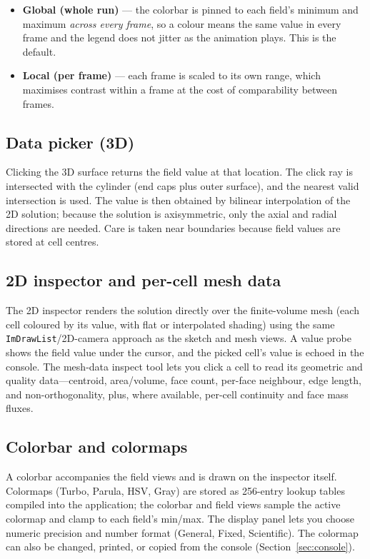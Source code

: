 \documentclass[11pt]{article}
\begin{document}
\begin{itemize}[nosep]
  \item \textbf{Global (whole run)} --- the colorbar is pinned to each field's minimum
        and maximum \emph{across every frame}, so a colour means the same value in every
        frame and the legend does not jitter as the animation plays. This is the default.
  \item \textbf{Local (per frame)} --- each frame is scaled to its own range, which
        maximises contrast within a frame at the cost of comparability between frames.
\end{itemize}

\subsection{Data picker (3D)}
Clicking the 3D surface returns the field value at that location. The click ray is
intersected with the cylinder (end caps plus outer surface), and the nearest valid
intersection is used. The value is then obtained by bilinear interpolation of the 2D
solution; because the solution is axisymmetric, only the axial and radial directions
are needed. Care is taken near boundaries because field values are stored at cell
centres.

\subsection{2D inspector and per-cell mesh data}
The 2D inspector renders the solution directly over the finite-volume mesh (each cell
coloured by its value, with flat or interpolated shading) using the same
\texttt{ImDrawList}/2D-camera approach as the sketch and mesh views. A value probe shows
the field value under the cursor, and the picked cell's value is echoed in the console.
The mesh-data inspect tool lets you click a cell to read its geometric and quality
data---centroid, area/volume, face count, per-face neighbour, edge length, and
non-orthogonality, plus, where available, per-cell continuity and face mass fluxes.

\subsection{Colorbar and colormaps}
A colorbar accompanies the field views and is drawn on the inspector itself. Colormaps
(Turbo, Parula, HSV, Gray) are stored as 256-entry lookup tables compiled into the
application; the colorbar and field views sample the active colormap and clamp to each
field's min/max. The display panel lets you choose numeric precision and number format
(General, Fixed, Scientific). The colormap can also be changed, printed, or copied from
the console (Section~\ref{sec:console}).
\end{document}
